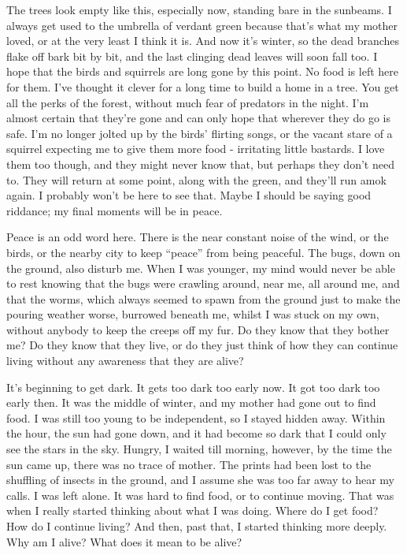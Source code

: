 The trees look empty like this, especially now, standing bare in the sunbeams. I always
get used to the umbrella of verdant green because that's what my mother loved, or at
the very least I think it is. And now it's winter, so the dead branches flake off bark bit by
bit, and the last clinging dead leaves will soon fall too. I hope that the birds and squirrels
are long gone by this point. No food is left here for them. I've thought it clever for a long
time to build a home in a tree. You get all the perks of the forest, without much fear of
predators in the night. I'm almost certain that they're gone and can only hope that
wherever they do go is safe. I'm no longer jolted up by the birds' flirting songs, or the
vacant stare of a squirrel expecting me to give them more food - irritating little bastards.
I love them too though, and they might never know that, but perhaps they don't need to.
They will return at some point, along with the green, and they'll run amok again. I
probably won't be here to see that. Maybe I should be saying good riddance; my final
moments will be in peace.

Peace is an odd word here. There is the near constant noise of the wind, or the birds, or
the nearby city to keep ``peace'' from being peaceful. The bugs, down on the ground, also
disturb me. When I was younger, my mind would never be able to rest knowing that the
bugs were crawling around, near me, all around me, and that the worms, which always
seemed to spawn from the ground just to make the pouring weather worse, burrowed
beneath me, whilst I was stuck on my own, without anybody to keep the creeps off my
fur. Do they know that they bother me? Do they know that they live, or do they just think
of how they can continue living without any awareness that they are alive?

It's beginning to get dark. It gets too dark too early now. It got too dark too early then. It
was the middle of winter, and my mother had gone out to find food. I was still too young
to be independent, so I stayed hidden away. Within the hour, the sun had gone down,
and it had become so dark that I could only see the stars in the sky. Hungry, I waited till
morning, however, by the time the sun came up, there was no trace of mother. The
prints had been lost to the shuffling of insects in the ground, and I assume she was too
far away to hear my calls. I was left alone. It was hard to find food, or to continue
moving. That was when I really started thinking about what I was doing. Where do I get
food? How do I continue living? And then, past that, I started thinking more deeply. Why
am I alive? What does it mean to be alive?


